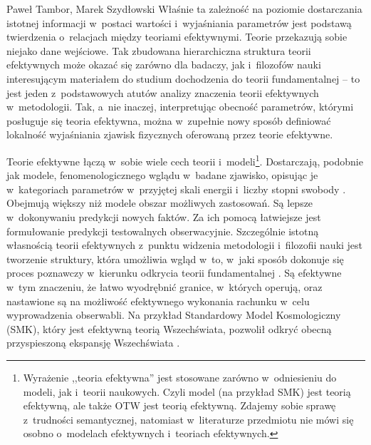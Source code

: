 \begin{artplenv}{Paweł Tambor, Marek Szydłowski}
Właśnie ta zależność na poziomie dostarczania istotnej informacji w~postaci wartości i~wyjaśniania parametrów jest podstawą twierdzenia o~relacjach między teoriami efektywnymi. Teorie przekazują sobie niejako dane wejściowe. Tak zbudowana hierarchiczna struktura teorii efektywnych może okazać się zarówno dla badaczy, jak i~filozofów nauki interesującym materiałem do studium dochodzenia do teorii fundamentalnej -- to jest jeden z~podstawowych atutów analizy znaczenia teorii efektywnych w~metodologii. Tak, a~nie inaczej, interpretując obecność parametrów, którymi posługuje się teoria efektywna, można w~zupełnie nowy sposób definiować lokalność wyjaśniania zjawisk fizycznych oferowaną przez teorie efektywne.

Teorie efektywne łączą w~sobie wiele cech teorii i~modeli\footnote{Wyrażenie ,,teoria efektywna'' jest stosowane zarówno w~odniesieniu do modeli, jak i~teorii naukowych. Czyli model (na przykład SMK) jest teorią efektywną, ale także OTW jest teorią efektywną. Zdajemy sobie sprawę z~trudności semantycznej, natomiast w~literaturze przedmiotu nie mówi się osobno o~modelach efektywnych i~teoriach efektywnych.}. Dostarczają, podobnie jak modele, fenomenologicznego wglądu w~badane zjawisko, opisując je w~kategoriach parametrów w~przyjętej skali energii i~liczby stopni swobody
\parencite[][]{draganescu_effective_2004}. %
 Obejmują większy niż modele obszar możliwych zastosowań. Są lepsze w~dokonywaniu predykcji nowych faktów. Za ich pomocą łatwiejsze jest formułowanie predykcji testowalnych obserwacyjnie. Szczególnie istotną własnością teorii efektywnych z~punktu widzenia metodologii i~filozofii nauki jest tworzenie struktury, która umożliwia wgląd w~to, w~jaki sposób dokonuje się proces poznawczy w~kierunku odkrycia teorii fundamentalnej 
\parencite[][]{castellani_reductionism_2002}. %
 Są efektywne w~tym znaczeniu, że łatwo wyodrębnić granice, w~których operują, oraz nastawione są na możliwość efektywnego wykonania rachunku w~celu wyprowadzenia obserwabli. Na przykład Standardowy Model Kosmologiczny (SMK), który jest efektywną teorią Wszechświata, pozwolił odkryć obecną przyspieszoną ekspansję Wszechświata 
\parencites[][]{perlmutter_discovery_1998}[][]{riess_observational_1998}[por.][]{tegmark_cosmological_2004}. %

\end{artplenv}

